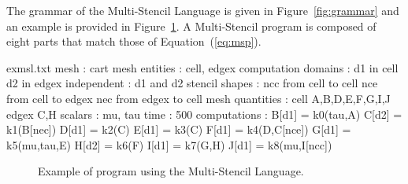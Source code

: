 The grammar of the Multi-Stencil Language is given in Figure~\ref{fig:grammar} and an example is provided in Figure~\ref{fig:exmsl}. A Multi-Stencil program is composed of eight parts that match those of Equation~(\ref{eq:msp}).

\begin{filecontents*}{exmsl.txt}
mesh : cart
mesh entities : cell, edgex
computation domains :
  d1 in cell
  d2 in edgex
independent :
  d1 and d2
stencil shapes : 
  ncc from cell to cell
  nce from cell to edgex
  nec from edgex to cell
mesh quantities :
  cell A,B,D,E,F,G,I,J
  edgex C,H
scalars : mu, tau
time : 500
computations :
  B[d1] = k0(tau,A)
  C[d2] = k1(B[nec])
  D[d1] = k2(C)
  E[d1] = k3(C)
  F[d1] = k4(D,C[nce])
  G[d1] = k5(mu,tau,E)
  H[d2] = k6(F)
  I[d1] = k7(G,H)
  J[d1] = k8(mu,I[ncc])
\end{filecontents*}

\begin{figure}[!h]
  \hspace{5mm}
  \begin{minipage}[!h]{0.98\textwidth}
    {}   
    \caption{Example of program using the Multi-Stencil Language. \label{fig:exmsl}}
  \end{minipage}
\end{figure}

